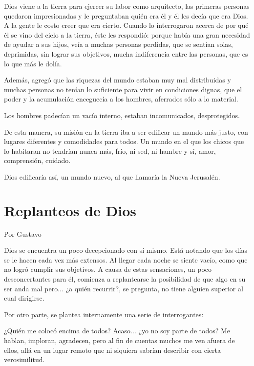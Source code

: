 \documentclass[11pt,twoside,openright,a5paper]{book}
\begin{document}
Dios viene a la tierra para ejercer su labor como arquitecto, las primeras personas quedaron impresionadas y le preguntaban quién era él y él les decía que era Dios. A la gente le costo creer que era cierto. Cuando lo interrogaron acerca de por qué él se vino del cielo a la tierra, éste les respondió: porque había una gran necesidad de ayudar a sus hijos, veía a muchas personas perdidas, que se sentían solas, deprimidas, sin lograr sus objetivos, mucha indiferencia entre las personas, que es lo que más le dolía.

Además, agregó que las riquezas del mundo estaban muy mal distribuidas y muchas personas no tenían lo suficiente para vivir en condiciones dignas, que el poder y la acumulación enceguecía a los hombres, aferrados sólo a lo material.

Los hombres padecían un vacío interno, estaban incomunicados, desprotegidos.

De esta manera, su misión en la tierra iba a ser  edificar un mundo más justo, con lugares diferentes y comodidades para todos. Un mundo en el que los chicos que lo habitaran no tendrían  nunca más, frío, ni sed, ni hambre y sí, amor, comprensión, cuidado.

Dios edificaría así, un mundo nuevo, al que llamaría la Nueva Jerusalén.
  
\section*{Replanteos de Dios}

\begin{flushright}Por Gustavo\end{flushright}

Dios se encuentra un poco decepcionado con sí mismo. Está notando que los días se le hacen cada vez más extensos. Al llegar cada noche se siente vacío, como que no logró cumplir sus objetivos. A causa de estas sensaciones, un poco desconcertantes para él, comienza a replantearse la posibilidad de que algo en su ser anda mal pero... ¿a quién recurrir?, se pregunta, no tiene alguien superior al cual dirigirse.

Por otro parte, se plantea internamente una serie de interrogantes:

¿Quién me colocó encima de todos? Acaso... ¿yo no soy parte de todos? Me hablan, imploran, agradecen, pero al fin de cuentas muchos me ven afuera de ellos, allá en un lugar remoto que ni siquiera sabrían describir con cierta verosimilitud. 
\end{document}
